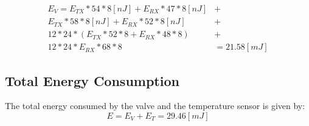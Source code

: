 \documentclass{Configuration_Files/PoliMi3i_thesis}
\begin{document}
\begin{equation}
 \begin{aligned}
    E_{V} = E_{TX}*54*8 [nJ] + E_{RX}*47*8 [nJ] &+ \\
    E_{TX}*58*8 [nJ] + E_{RX}*52*8 [nJ] &+ \\
    12*24*(E_{TX}*52*8 + E_{RX}*48*8) &+ \\
    12*24*E_{RX}*68*8 &= 21.58 [mJ]
 \end{aligned}
\end{equation}

\subsection{Total Energy Consumption}
The total energy consumed by the valve and the temperature sensor is given by:
\begin{equation}
    E = E_V + E_T = 29.46 [mJ]
\end{equation}
\end{document}
